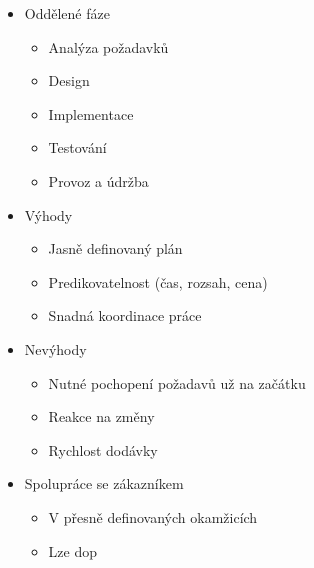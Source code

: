         \begin{itemize}
          \item Oddělené fáze
            \begin{itemize}
              \item Analýza požadavků
              \item Design
              \item Implementace
              \item Testování
              \item Provoz a údržba
            \end{itemize}
          \item Výhody
            \begin{itemize}
              \item Jasně definovaný plán
              \item Predikovatelnost (čas, rozsah, cena)
              \item Snadná koordinace práce
            \end{itemize}
          \item Nevýhody
            \begin{itemize}
              \item Nutné pochopení požadavů už na začátku
              \item Reakce na změny
              \item Rychlost dodávky
            \end{itemize}
          \item Spolupráce se zákazníkem
            \begin{itemize}
              \item V přesně definovaných okamžicích
              \item Lze dop
            \end{itemize}
        \end{itemize}

